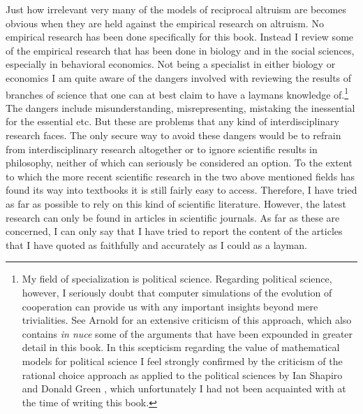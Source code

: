 Just how irrelevant very many of the models of reciprocal altruism are becomes
obvious when they are held against the empirical research on altruism. No
empirical research has been done specifically for this book. Instead I review
some of the empirical research that has been done in biology and in the social
sciences, especially in behavioral economics. Not being a specialist in
either biology or economics I am quite aware of the dangers involved with
reviewing the results of branches of science that one can at best claim to
have a laymans knowledge of.\footnote{My field of specialization is political
science. Regarding political science, however, I seriously doubt that computer
simulations of the evolution of cooperation can provide us with
any important insights beyond mere trivialities. See Arnold
\cite[]{arnold:2005b} for an extensive criticism of this approach, which also
contains {\em in nuce} some of the arguments that have been expounded in
greater detail in this book. In this scepticism regarding the value of mathematical models for political science I feel strongly confirmed by the criticism of the rational choice approach as applied to the political sciences by Ian Shapiro and Donald Green \cite[]{green-shapiro:1994, shapiro:2005}, which unfortunately I had not been acquainted with at the time of writing this book.} The dangers include misunderstanding, misrepresenting, mistaking the
inessential for the essential etc. But these are problems that any kind of
interdisciplinary research faces. The only secure way to avoid these dangers
would be to refrain from interdisciplinary research altogether or to ignore
scientific results in philosophy, neither of which can seriously be considered
an option. To the extent to which the more recent scientific research in the
two above mentioned fields has found its way into textbooks it is still fairly
easy to access. Therefore, I have tried as far as possible to rely on this
kind of scientific literature. However, the latest research can only be found
in articles in scientific journals. As far as these are concerned, I can only
say that I have tried to report the content of the articles that I have quoted
as faithfully and accurately as I could as a layman.

